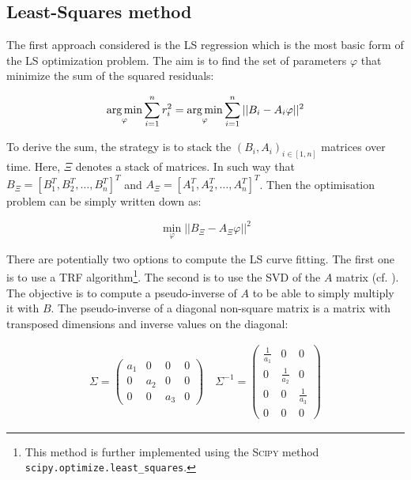 \documentclass[/home/francois/latex/report/main.tex]{subfiles}
\begin{document}
\subsection{Least-Squares method}
\label{subsection:ls}

The first approach considered is the \ac{LS} regression which is the most basic form of the \ac{LS} optimization problem. The aim is to find the set of parameters $\varphi$ that minimize the sum of the squared residuals:

\begin{equation}
  \operatorname*{arg\,min}_{\varphi} \sum_{i=1}^{n} r_i^2 = \operatorname*{arg\,min}_{\varphi} \sum_{i=1}^{n} ||B_i - A_i \varphi||^2
\end{equation}

To derive the sum, the strategy is to stack the $(B_i, A_i)_{i \in [1, n]}$ matrices over time. Here, $\Xi$ denotes a stack of matrices. In such way that $B_\Xi = [B_1^T, B_2^T, \ldots, B_n^T]^T$ and $A_\Xi = [A_1^T, A_2^T, \ldots, A_n^T]^T$. Then the optimisation problem can be simply written down as:

\begin{equation}
  \label{eq:background:stacked-ls}
  \min_{\varphi} ||B_\Xi - A_\Xi \varphi||^2
\end{equation}

There are potentially two options to compute the \ac{LS} curve fitting. The first one is to use a \ac{TRF} algorithm\footnote{This method is further implemented using the \textsc{Scipy} method \texttt{scipy.optimize.least\_squares}.}. The second is to use the \ac{SVD} of the $A$ matrix (cf. \cite{Gander2008}). The objective is to compute a pseudo-inverse of $A$ to be able to simply multiply it with $B$. The pseudo-inverse of a diagonal non-square matrix is a matrix with transposed dimensions and inverse values on the diagonal:

\begin{align*}
  \Sigma =
  \begin{pmatrix}
    a_1 & 0 & 0 & 0 \\
    0 & a_2 & 0 & 0 \\
    0 & 0 & a_3 & 0
  \end{pmatrix}
  &
  \ \Sigma^{-1} =
  \begin{pmatrix}
    \frac{1}{a_1} & 0 & 0 \\
    0 & \frac{1}{a_2} & 0 \\
    0 & 0 & \frac{1}{a_3} \\
    0 & 0 & 0
  \end{pmatrix}
\end{align*}
\end{document}
